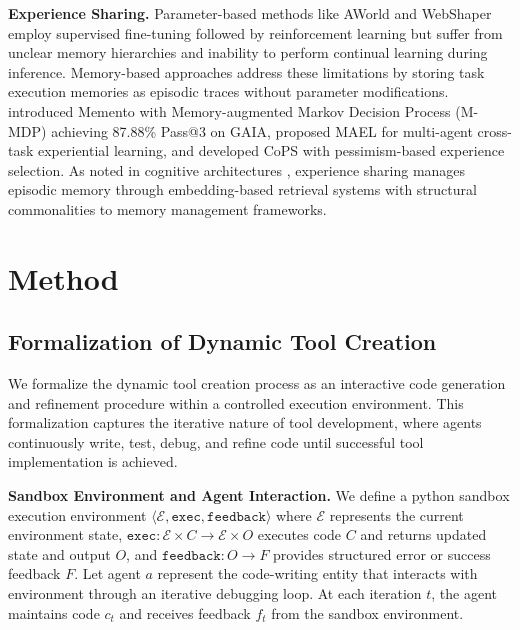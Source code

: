 \documentclass{article} %
\begin{document}
\textbf{Experience Sharing.} Parameter-based methods like AWorld \citep{yu2025aworld} and WebShaper \citep{tao2025webshaper} employ supervised fine-tuning followed by reinforcement learning but suffer from unclear memory hierarchies and inability to perform continual learning during inference. Memory-based approaches address these limitations by storing task execution memories as episodic traces without parameter modifications. \citet{zhou2025memento} introduced Memento with Memory-augmented Markov Decision Process (M-MDP) achieving 87.88\% Pass@3 on GAIA, \citet{li2025cross} proposed MAEL for multi-agent cross-task experiential learning, and \citet{yang2024cops} developed CoPS with pessimism-based experience selection. As noted in cognitive architectures \citep{sumers2023cognitive}, experience sharing manages episodic memory through embedding-based retrieval systems with structural commonalities to memory management frameworks.

\section{Method}
\label{method}

\subsection{Formalization of Dynamic Tool Creation}
\label{tool_creaction}

We formalize the dynamic tool creation process as an interactive code generation and refinement procedure within a controlled execution environment. This formalization captures the iterative nature of tool development, where agents continuously write, test, debug, and refine code until successful tool implementation is achieved.

\textbf{Sandbox Environment and Agent Interaction.} We define a python sandbox execution environment $ \langle \mathcal{E}, \texttt{exec}, \texttt{feedback} \rangle$ where $\mathcal{E}$ represents the current environment state, $\texttt{exec}: \mathcal{E} \times C \rightarrow \mathcal{E} \times O$ executes code $C$ and returns updated state and output $O$, and $\texttt{feedback}: O \rightarrow F$ provides structured error or success feedback $F$. Let agent $a$ represent the code-writing entity that interacts with environment through an iterative debugging loop. At each iteration $t$, the agent maintains code $c_t$ and receives feedback $f_t$ from the sandbox environment.
\end{document}
